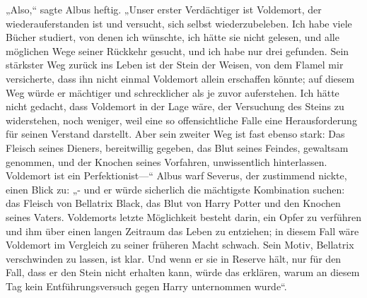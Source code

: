 „Also,“ sagte Albus heftig. „Unser erster Verdächtiger ist Voldemort, der wiederauferstanden ist und versucht, sich selbst wiederzubeleben. Ich habe viele Bücher studiert, von denen ich wünschte, ich hätte sie nicht gelesen, und alle möglichen Wege seiner Rückkehr gesucht, und ich habe nur drei gefunden. Sein stärkster Weg zurück ins Leben ist der Stein der Weisen, von dem Flamel mir versicherte, dass ihn nicht einmal Voldemort allein erschaffen könnte; auf diesem Weg würde er mächtiger und schrecklicher als je zuvor auferstehen. Ich hätte nicht gedacht, dass Voldemort in der Lage wäre, der Versuchung des Steins zu widerstehen, noch weniger, weil eine so offensichtliche Falle eine Herausforderung für seinen Verstand darstellt. Aber sein zweiter Weg ist fast ebenso stark: Das Fleisch seines Dieners, bereitwillig gegeben, das Blut seines Feindes, gewaltsam genommen, und der Knochen seines Vorfahren, unwissentlich hinterlassen. Voldemort ist ein Perfektionist—“ Albus warf Severus, der zustimmend nickte, einen Blick zu: „- und er würde sicherlich die mächtigste Kombination suchen: das Fleisch von Bellatrix Black, das Blut von Harry Potter und den Knochen seines Vaters. Voldemorts letzte Möglichkeit besteht darin, ein Opfer zu verführen und ihm über einen langen Zeitraum das Leben zu entziehen; in diesem Fall wäre Voldemort im Vergleich zu seiner früheren Macht schwach. Sein Motiv, Bellatrix verschwinden zu lassen, ist klar. Und wenn er sie in Reserve hält, nur für den Fall, dass er den Stein nicht erhalten kann, würde das erklären, warum an diesem Tag kein Entführungsversuch gegen Harry unternommen wurde“.


